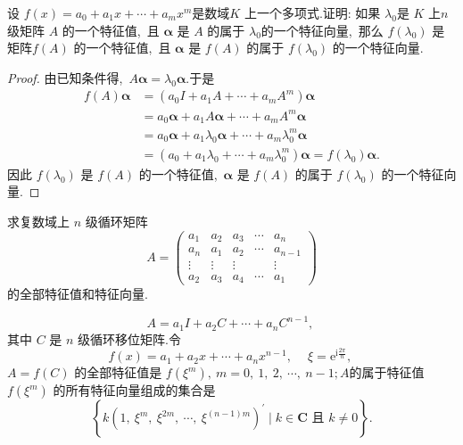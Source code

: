 \newpage
\begin{problem}
	设  $f(x)=a_{0}+a_{1} x+\cdots+a_{m} x^{m}  $是数域$  K $ 上一个多项式.证明: 如果 $ \lambda_{0}  $是 $ K $ 上$  n$  级矩阵  $A$  的一个特征值,\  且  $\boldsymbol{\alpha}$  是  $A $ 的属于 $ \lambda_{0}  $的一个特征向量,\  那么  $f\left(\lambda_{0}\right) $ 是矩阵$  f(A) $ 的一个特征值,\  且  $\boldsymbol{\alpha} $ 是  $f(A) $ 的属于 $ f\left(\lambda_{0}\right)$  的一个特征向量.
\end{problem}
\begin{proof}
	由已知条件得,\   $A \boldsymbol{\alpha}=\lambda_{0} \boldsymbol{\alpha} .$于是
	$$\begin{aligned}
		f(A) \boldsymbol{\alpha} & =\left(a_{0} I+a_{1} A+\cdots+a_{m} A^{m}\right) \boldsymbol{\alpha} \\
		& =a_{0} \boldsymbol{\alpha}+a_{1} A \boldsymbol{\alpha}+\cdots+a_{m} A^{m} \boldsymbol{\alpha} \\
		& =a_{0} \boldsymbol{\alpha}+a_{1} \lambda_{0} \boldsymbol{\alpha}+\cdots+a_{m} \lambda_{0}^{m} \boldsymbol{\alpha} \\
		& =\left(a_{0}+a_{1} \lambda_{0}+\cdots+a_{m} \lambda_{0}^{m}\right) \boldsymbol{\alpha}=f\left(\lambda_{0}\right) \boldsymbol{\alpha} .
	\end{aligned}$$
	因此  $f\left(\lambda_{0}\right)$  是 $ f(A) $ 的一个特征值,\   $\boldsymbol{\alpha} $ 是  $f(A)$  的属于  $f\left(\lambda_{0}\right) $ 的一个特征向量.
\end{proof}
\begin{problem}
	求复数域上  $n $ 级循环矩阵
	$$A=\left(\begin{array}{ccccc}
		a_{1} & a_{2} & a_{3} & \cdots & a_{n} \\
		a_{n} & a_{1} & a_{2} & \cdots & a_{n-1} \\
		\vdots & \vdots & \vdots & & \vdots \\
		a_{2} & a_{3} & a_{4} & \cdots & a_{1}
	\end{array}\right)$$
	的全部特征值和特征向量.
\end{problem}
\begin{solution}
	$$A=a_{1} I+a_{2} C+\cdots+a_{n} C^{n-1},\ $$
	其中 $ C$  是 $ n$  级循环移位矩阵.令
	$$f(x)=a_{1}+a_{2} x+\cdots+a_{n} x^{n-1},\  \quad \xi=\mathrm{e}^{\mathrm{i} \frac{2 \pi}{n}},\ $$
	$A=f(C) $ 的全部特征值是 $ f\left(\xi^{m}\right),\  m=0,\ 1,\ 2,\  \cdots,\  n-1 ;  A  $的属于特征值  $f\left(\xi^{m}\right) $ 的所有特征向量组成的集合是
	$$\left\{k\left(1,\  \xi^{m},\  \xi^{2 m},\  \cdots,\  \xi^{(n-1) m}\right)^{\prime} \mid k \in \mathbf{C} \text { 且 } k \neq 0\right\} .$$
\end{solution}

